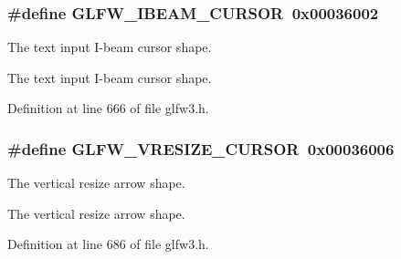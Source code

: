 \subsubsection[{G\+L\+F\+W\+\_\+\+I\+B\+E\+A\+M\+\_\+\+C\+U\+R\+S\+O\+R}]{\setlength{\rightskip}{0pt plus 5cm}\#define G\+L\+F\+W\+\_\+\+I\+B\+E\+A\+M\+\_\+\+C\+U\+R\+S\+O\+R~0x00036002}\label{group__shapes_ga36185f4375eaada1b04e431244774c86}


The text input I-\/beam cursor shape. 

The text input I-\/beam cursor shape. 

Definition at line 666 of file glfw3.\+h.

\hypertarget{group__shapes_gaf024f0e1ff8366fb2b5c260509a1fce5}{}
\subsubsection[{G\+L\+F\+W\+\_\+\+V\+R\+E\+S\+I\+Z\+E\+\_\+\+C\+U\+R\+S\+O\+R}]{\setlength{\rightskip}{0pt plus 5cm}\#define G\+L\+F\+W\+\_\+\+V\+R\+E\+S\+I\+Z\+E\+\_\+\+C\+U\+R\+S\+O\+R~0x00036006}\label{group__shapes_gaf024f0e1ff8366fb2b5c260509a1fce5}


The vertical resize arrow shape. 

The vertical resize arrow shape. 

Definition at line 686 of file glfw3.\+h.

